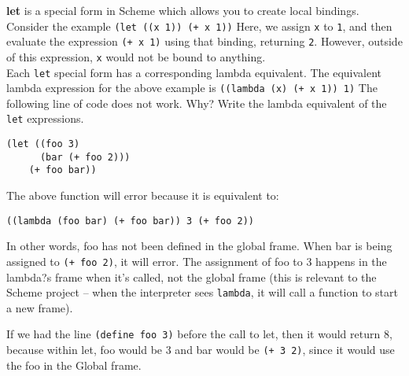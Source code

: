 \begin{blocksection}
\question
\textbf{let} is a special form in Scheme which allows you to create local bindings. Consider the example 
\newline
\newline
\texttt{(let ((x 1)) (+ x 1))}
\newline
\newline
Here, we assign \texttt{x} to \texttt{1}, and then evaluate the expression \texttt{(+ x 1)} using that binding, returning \texttt{2}. However, outside of this expression, \texttt{x} would not be bound to anything. \\
Each \texttt{let} special form has a corresponding lambda equivalent. The equivalent lambda expression for the above example is 
\newline
\newline
\texttt{((lambda (x) (+ x 1)) 1)}
\newline
\newline
The following line of code does not work. Why? Write the lambda
equivalent of the \texttt{let} expressions.

\begin{lstlisting}
(let ((foo 3)
      (bar (+ foo 2)))
    (+ foo bar))
\end{lstlisting}
\begin{solution}[0.5in]
The above function will error because it is equivalent to:
\begin{lstlisting}
((lambda (foo bar) (+ foo bar)) 3 (+ foo 2))
\end{lstlisting}

In other words, foo has not been defined in the global frame. When bar is being
assigned to \texttt{(+ foo 2)}, it will error. The assignment of foo to 3
happens in the lambda?s frame when it's called, not the global frame (this is
relevant to the Scheme project -- when the interpreter sees \texttt{lambda}, it
will call a function to start a new frame).

If we had the line \texttt{(define foo 3)} before the call to let, then it would
return 8, because within let, foo would be 3 and bar would be \texttt{(+ 3 2)},
since it would use the foo in the Global frame.
\end{solution}

\end{blocksection}
